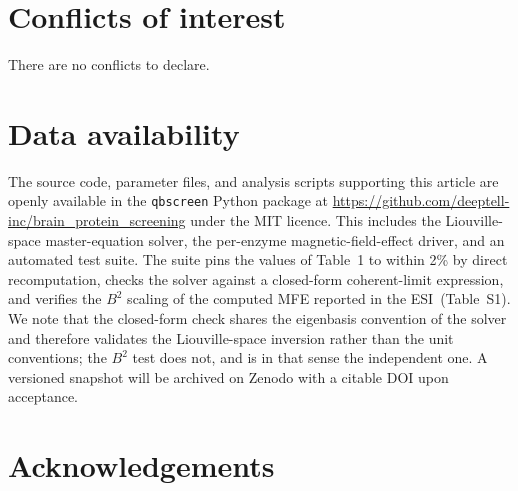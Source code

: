 \documentclass[twoside,twocolumn,9pt]{article}
\renewcommand{\refname}{Notes and references}
\begin{document}
\section*{Conflicts of interest}
There are no conflicts to declare.

\section*{Data availability}
The source code, parameter files, and analysis scripts supporting this article are
openly available in the \texttt{qbscreen} Python package at
\url{https://github.com/deeptell-inc/brain_protein_screening} under the MIT
licence. This includes the Liouville-space master-equation solver, the per-enzyme
magnetic-field-effect driver, and an automated test suite. The suite pins the
values of Table~1 to within 2\% by direct recomputation, checks the solver against
a closed-form coherent-limit expression, and verifies the $B^2$ scaling of the
computed MFE reported in the ESI\dag\ (Table~S1). We note that the closed-form
check shares the eigenbasis convention of the solver and therefore validates the
Liouville-space inversion rather than the unit conventions; the $B^2$ test does
not, and is in that sense the independent one. A versioned snapshot
will be archived on Zenodo with a citable DOI upon acceptance.

\section*{Acknowledgements}




\balance


\end{document}

